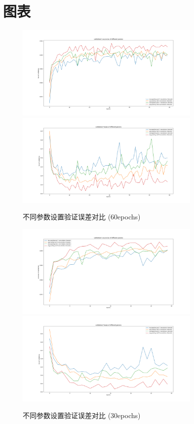 \documentclass{article}
\begin{document}
	\section{图表}
		\begin{figure}[htbp]
			\centering
			\includegraphics[width=0.8\textwidth]{figure/epochs_60_100_acc.png}
			\includegraphics[width=0.8\textwidth]{figure/epochs_60_100_loss.png}\label{fig:epoch60}
			\caption{不同参数设置验证误差对比 (60epochs)}
		\end{figure}

		\begin{figure}[htbp]
			\centering
			\includegraphics[width=0.8\textwidth]{figure/epochs_30_100_acc.png}
			\includegraphics[width=0.8\textwidth]{figure/epochs_30_100_loss.png}\label{fig:epoch30}
			\caption{不同参数设置验证误差对比 (30epochs)}
		\end{figure}
\end{document}

